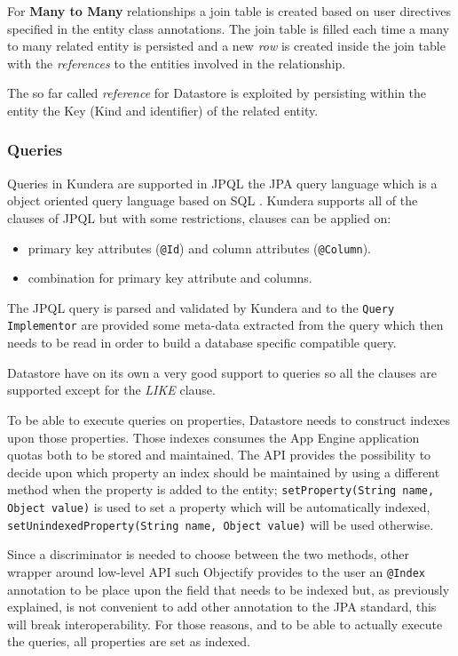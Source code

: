 \noindent For \textbf{Many to Many} relationships a join table is created based on user directives specified in the entity class annotations. The join table is filled each time a many to many related entity is persisted and a new \textit{row} is created inside the join table with the \textit{references} to the entities involved in the relationship.

\noindent The so far called \textit{reference} for Datastore is exploited by persisting within the entity the Key (Kind and identifier) of the related entity.

\subsubsection{Queries}
Queries in Kundera are supported in JPQL the JPA query language which is a  object oriented query language based on SQL \cite{book:projpa2}.
Kundera supports all of the clauses of JPQL but with some restrictions, clauses can be applied on:
\begin{itemize}
\item primary key attributes (\texttt{@Id}) and column attributes (\texttt{@Column}).
\item combination for primary key attribute and columns.
\end{itemize}

\noindent The JPQL query is parsed and validated by Kundera and to the \texttt{Query Implementor} are provided some meta-data extracted from the query which then needs to be read in order to build a database specific compatible query.

    
\newparagraph Datastore have on its own a very good support to queries so all the clauses are supported except for the \textit{LIKE} clause.

\noindent To be able to execute queries on properties, Datastore needs to construct indexes upon those properties. Those indexes consumes the App Engine application quotas both to be stored and maintained. The API provides the possibility to decide upon which property an index should be maintained by using a different method when the property is added to the entity; \texttt{setProperty(String name, Object value)} is used to set a property which will be automatically indexed,  \texttt{setUnindexedProperty(String name, Object value)} will be used otherwise.

\noindent Since a discriminator is needed to choose between the two methods, other wrapper around low-level API such Objectify \cite{online:objectify} provides to the user an \texttt{@Index} annotation to be place upon the field that needs to be indexed but, as previously explained, is not convenient to add other annotation to the JPA standard, this will break interoperability. For those reasons, and to be able to actually execute the queries, all properties are set as indexed.

